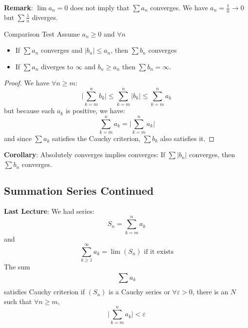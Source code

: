 \documentclass{report}
\begin{document}
\textbf{Remark}: $\lim a_{n} = 0$ does not imply that $\sum a_{n}$ converges. We 
have $a_{n} = \frac{1}{n} \rightarrow 0$ but $\sum \frac{1}{n}$ diverges.

\begin{theorem}{Comparison Test}
    Assume $a_{n} \geq 0$ and $\forall n$
        \begin{itemize}
            \item If $\sum a_{n}$ converges and $\lvert b_{n} \rvert \leq a_{n}$, then $\sum b_{n}$ converges

            \item If $\sum a_{n}$ diverges to $\infty$ and $b_{n} \geq a_{n}$ then $\sum b_{n} = \infty$.
        \end{itemize}
\end{theorem}

\begin{proof}
    We have $\forall n \geq m$:
        \begin{equation*}
            \lvert \sum_{k = m}^{n}b_{k} \rvert \leq \sum_{k = m}^{n}\lvert b_{k} \rvert \leq \sum_{k = m}^{n}a_{k}
        \end{equation*}
    but because each $a_{k}$ is positive, we have:
        \begin{equation*}
            \sum_{k = m}^{n}a_{k} = \lvert \sum_{k = m}^{n}a_{k} \rvert
        \end{equation*}
    and since $\sum a_{k}$ satisfies the Cauchy criterion, $\sum b_{k}$ also satisfies it.
\end{proof}

\textbf{Corollary}: Absolutely converges implies converges:
If $\sum \lvert b_{n} \rvert$ converges, then $\sum b_{n}$ converges.

\begin{topic}
    \section{Summation Series Continued}
\end{topic}

\textbf{Last Lecture}: We had series:
    \begin{equation*}
        S_{n} = \sum_{k = m}^{n} a_{k}
    \end{equation*}
and
    \begin{equation*}
        \sum_{k \geq 1}^{\infty} a_{k} = \lim(S_{n}) \text{ if it exists}
    \end{equation*}
The sum 
    \begin{equation*}
        \sum_{}^{} a_{k}
    \end{equation*}
satisfies Cauchy criterion if $(S_{n})$ is a Cauchy series or $\forall  \varepsilon > 0$, there is an $N$ such that $\forall n \geq m$, 
    \begin{equation*}
        \lvert \sum_{k = m}^{n} a_{k} \rvert <  \varepsilon
    \end{equation*}
\end{document}
